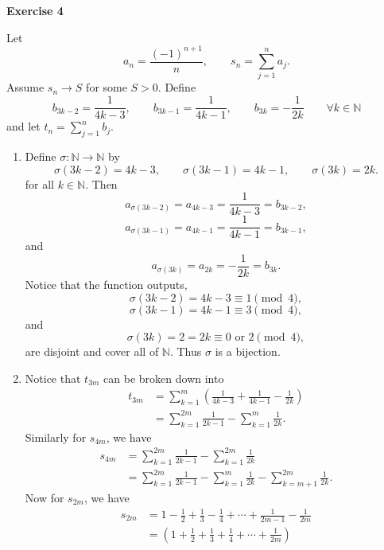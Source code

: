 \documentclass[12pt]{article}
\begin{document}
\noindent{} \textbf{Exercise 4}

Let
\[
    a_n = \frac{(-1)^{n+1}}{n}, \qquad s_n = \sum_{j=1}^{n}a_j.
\]
Assume $s_n \to S$ for some $S > 0$.
Define
\[
    b_{3k-2} = \frac{1}{4k-3}, \qquad b_{3k-1} = \frac{1}{4k-1}, \qquad b_{3k} = -\frac{1}{2k} \qquad \forall k \in \mathbb{N}
\]
and let $t_n = \sum_{j=1}^{n} b_j$.
\begin{enumerate}
    \item [(a)]
          Define $\sigma: \mathbb{N} \to \mathbb{N}$ by
          \[
              \sigma(3k-2) = 4k-3, \qquad \sigma(3k-1) = 4k-1, \qquad \sigma(3k) = 2k.
          \]
          for all $k \in \mathbb{N}$.
          Then
          \[
              a_{\sigma(3k-2)} = a_{4k-3} = \frac{1}{4k-3} = b_{3k-2},
          \]
          \[
              a_{\sigma(3k-1)} = a_{4k-1} = \frac{1}{4k-1} = b_{3k-1},
          \]
          and
          \[
              a_{\sigma(3k)} = a_{2k} = -\frac{1}{2k} = b_{3k}.
          \]
          Notice that the function outputs,
          \[
              \sigma(3k-2) = 4k-3 \equiv 1 \pmod 4,
          \]
          \[
              \sigma(3k-1) = 4k-1 \equiv 3 \pmod 4,
          \]
          and
          \[
              \sigma(3k) = 2 = 2k \equiv 0 \text{ or } 2 \pmod 4,
          \]
          are disjoint and cover all of $\mathbb{N}$.
          Thus $\sigma$ is a bijection.
    \item [(b)]
          Notice that $t_{3m}$ can be broken down into
          \begin{align*}
              t_{3m} & = \sum_{k=1}^{m}\left(\frac{1}{4k-3} + \frac{1}{4k-1} - \frac{1}{2k}\right) \\
                     & = \sum_{k=1}^{2m} \frac{1}{2k-1} - \sum_{k=1}^{m} \frac{1}{2k}.
          \end{align*}
          Similarly for $s_{4m}$, we have
          \begin{align*}
              s_{4m} & = \sum_{k=1}^{2m} \frac{1}{2k-1} - \sum_{k=1}^{2m} \frac{1}{2k}                              \\
                     & =\sum_{k=1}^{2m}\frac{1}{2k-1} - \sum_{k=1}^{m}\frac{1}{2k} - \sum_{k=m+1}^{2m}\frac{1}{2k}.
          \end{align*}
          Now for $s_{2m}$, we have
          \[
              \begin{aligned}
                  s_{2m}
                   & =1-\frac12+\frac13-\frac14+\cdots+\frac1{2m-1}-\frac1{2m} \\
                   & =\left(1+\frac12+\frac13+\frac14+\cdots+\frac1{2m}\right)

\end{aligned}\]
\end{enumerate}
\end{document}
